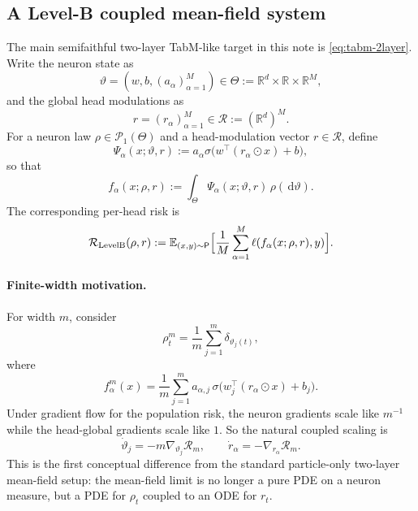 \documentclass[11pt]{article}
\theoremstyle{definition}
\newcommand{\R}{\mathbb{R}}
\newcommand{\E}{\mathbb{E}}
\newcommand{\PP}{\mathcal{P}}
\newcommand{\dd}{\,\mathrm{d}}
\begin{document}
\subsection{A Level-B coupled mean-field system}

The main semifaithful two-layer TabM-like target in this note is \eqref{eq:tabm-2layer}.
Write the neuron state as
\[
  \vartheta=(w,b,(a_\alpha)_{\alpha=1}^M)
  \in
  \Theta
  :=
  \R^d\times \R \times \R^M,
\]
and the global head modulations as
\[
  r=(r_\alpha)_{\alpha=1}^M\in \mathcal{R}:=(\R^d)^M.
\]
For a neuron law $\rho\in \PP_1(\Theta)$ and a head-modulation vector $r\in\mathcal R$, define
\[
  \Psi_\alpha(x;\vartheta,r)
  :=
  a_\alpha \sigma\bigl(w^\top (r_\alpha\odot x)+b\bigr),
\]
so that
\begin{equation}
  f_\alpha(x;\rho,r)
  :=
  \int_\Theta
  \Psi_\alpha(x;\vartheta,r)
  \,\rho(\dd \vartheta).
  \label{eq:levelb-output}
\end{equation}
The corresponding per-head risk is
\begin{equation}
  \mathcal R_{\mathrm{LevelB}}(\rho,r)
  :=
  \E_{(x,y)\sim \mathsf P}
  \Bigl[
    \frac1M\sum_{\alpha=1}^M
    \ell(f_\alpha(x;\rho,r),y)
  \Bigr].
  \label{eq:levelb-risk}
\end{equation}

\paragraph{Finite-width motivation.}
For width $m$, consider
\[
  \rho_t^m=\frac1m\sum_{j=1}^m \delta_{\vartheta_j(t)},
\]
where
\[
  f_{\alpha}^{m}(x)
  =
  \frac1m\sum_{j=1}^m
  a_{\alpha,j}\,\sigma\bigl(w_j^\top (r_\alpha\odot x)+b_j\bigr).
\]
Under gradient flow for the population risk, the neuron gradients scale like $m^{-1}$ while the head-global gradients scale like $1$.
So the natural coupled scaling is
\begin{equation}
  \dot \vartheta_j = -m \nabla_{\vartheta_j}\mathcal R_m,
  \qquad
  \dot r_\alpha = - \nabla_{r_\alpha}\mathcal R_m.
  \label{eq:levelb-scaling}
\end{equation}
This is the first conceptual difference from the standard particle-only two-layer mean-field setup:
the mean-field limit is no longer a pure PDE on a neuron measure, but a PDE for $\rho_t$ coupled to an ODE for $r_t$.
\end{document}
